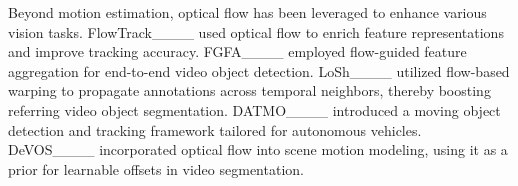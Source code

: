 Beyond motion estimation, optical flow has been leveraged to enhance various vision tasks. FlowTrack____ used optical flow to enrich feature representations and improve tracking accuracy. FGFA____ employed flow-guided feature aggregation for end-to-end video object detection. LoSh____ utilized flow-based warping to propagate annotations across temporal neighbors, thereby boosting referring video object segmentation. DATMO____ introduced a moving object detection and tracking framework tailored for autonomous vehicles. DeVOS____ incorporated optical flow into scene motion modeling, using it as a prior for learnable offsets in video segmentation.